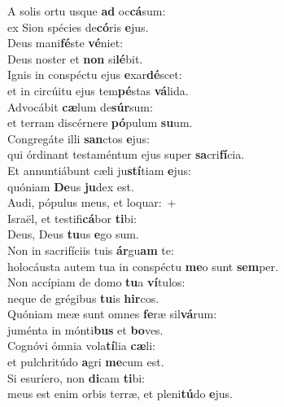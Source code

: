 \evenverse A solis ortu usque \textbf{ad} oc\textbf{cá}sum:~\*\\
\evenverse ex Sion spécies de\textbf{có}ris \textbf{e}jus.\\
\oddverse Deus mani\textbf{fé}ste \textbf{vé}niet:~\*\\
\oddverse Deus noster et \textbf{non} si\textbf{lé}bit.\\
\evenverse Ignis in conspéctu ejus \textbf{e}xar\textbf{dé}scet:~\*\\
\evenverse et in circúitu ejus tem\textbf{pé}stas \textbf{vá}lida.\\
\oddverse Advocábit \textbf{cæ}lum de\textbf{súr}sum:~\*\\
\oddverse et terram discérnere \textbf{pó}pulum \textbf{su}um.\\
\evenverse Congregáte illi \textbf{san}ctos \textbf{e}jus:~\*\\
\evenverse qui órdinant testaméntum ejus super \textbf{sa}cri\textbf{fí}cia.\\
\oddverse Et annuntiábunt cæli ju\textbf{stí}tiam \textbf{e}jus:~\*\\
\oddverse quóniam \textbf{De}us \textbf{ju}dex est.\\
\evenverse Audi, pópulus meus, et loquar:~+\\
\evenverse  Israël, et testifi\textbf{cá}bor \textbf{ti}bi:~\*\\
\evenverse Deus, Deus \textbf{tu}us \textbf{e}go sum.\\
\oddverse Non in sacrifíciis tuis \textbf{ár}gu\textbf{am} te:~\*\\
\oddverse holocáusta autem tua in conspéctu \textbf{me}o sunt \textbf{sem}per.\\
\evenverse Non accípiam de domo \textbf{tu}a \textbf{ví}tulos:~\*\\
\evenverse neque de grégibus \textbf{tu}is \textbf{hir}cos.\\
\oddverse Quóniam meæ sunt omnes \textbf{fe}ræ sil\textbf{vá}rum:~\*\\
\oddverse juménta in mónti\textbf{bus} et \textbf{bo}ves.\\
\evenverse Cognóvi ómnia vola\textbf{tí}lia \textbf{cæ}li:~\*\\
\evenverse et pulchritúdo \textbf{a}gri \textbf{me}cum est.\\
\oddverse Si esuríero, non \textbf{di}cam \textbf{ti}bi:~\*\\
\oddverse meus est enim orbis terræ, et pleni\textbf{tú}do \textbf{e}jus.\\
